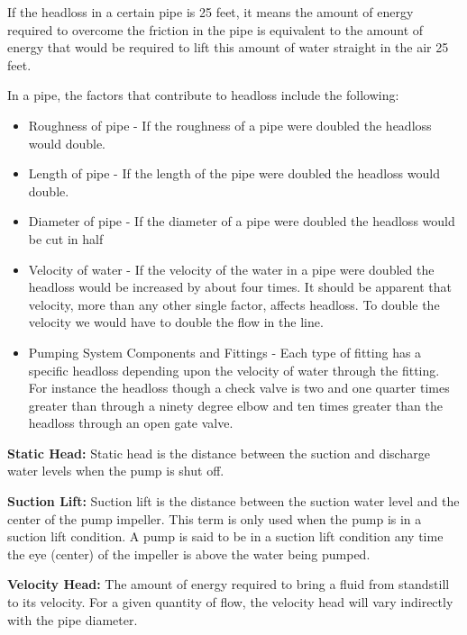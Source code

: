 If the headloss in a certain pipe is 25 feet, it means the amount of energy required to overcome the friction in the pipe is equivalent to the amount of energy that would be required to lift this amount of water straight in the air 25 feet.

In a pipe, the factors that contribute to headloss include the following:

\begin{itemize}
  \item Roughness of pipe - If the roughness of a pipe were doubled the headloss would double.

  \item Length of pipe - If the length of the pipe were doubled the headloss would double.

  \item Diameter of pipe - If the diameter of a pipe were doubled the headloss would be cut in half

  \item Velocity of water - If the velocity of the water in a pipe were doubled the headloss would be increased by about four times. It should be apparent that velocity, more than any other single factor, affects headloss. To double the velocity we would have to double the flow in the line.
  
  \item Pumping System Components and Fittings - Each type of fitting has a specific headloss depending upon the velocity of water through the fitting. For instance the headloss though a check valve is two and one quarter times greater than through a ninety degree elbow and ten times greater than the headloss through an open gate valve.

\end{itemize}

\textbf{Static Head: }  Static head is the distance between the suction and discharge water levels when the pump is shut off. 

\textbf{Suction Lift: } Suction lift is the distance between the suction water level and the center of the pump impeller. This term is only used when the pump is in a suction lift condition. A pump is said to be in a suction lift condition any time the eye (center) of the impeller is above the water being pumped.

\textbf{Velocity Head: } The amount of energy required to bring a fluid from standstill to its velocity. For a given quantity of flow, the velocity head will vary indirectly with the pipe diameter.

